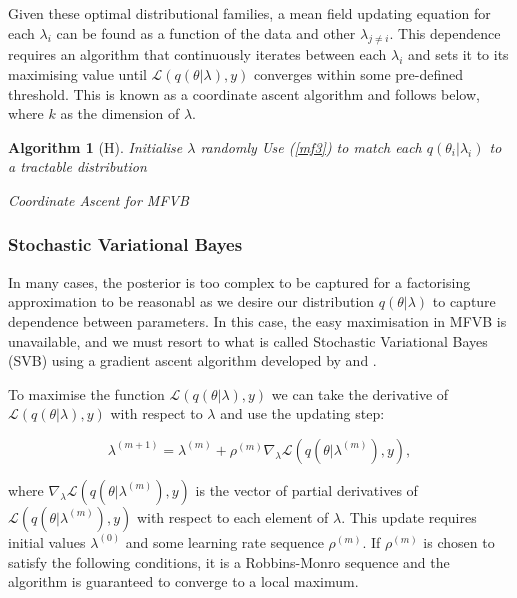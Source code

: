 \documentclass{article}\usepackage[]{graphicx}\usepackage[]{color}
\newtheorem{algorithm}[theorem]{Algorithm}
\begin{document}
Given these optimal distributional families, a mean field updating equation for each $\lambda_i$ can be found as a function of the data and other $\lambda_{j \neq i}$. This dependence requires an algorithm that continuously iterates between each $\lambda_i$ and sets it to its maximising value until $\mathcal{L}(q(\theta | \lambda), y)$ converges within some pre-defined threshold. This is known as a coordinate ascent algorithm and follows below, where $k$ as the dimension of $\lambda$.

\vspace{2mm}

\begin{algorithm}[H]
 Initialise $\lambda$ randomly\;
 Use (\ref{mf3}) to match each $q(\theta_i|\lambda_i)$ to a tractable distribution\;
 \caption{Coordinate Ascent for MFVB}
  \label{alg:algorithm1}
\end{algorithm}

\subsubsection{Stochastic Variational Bayes}

In many cases, the posterior is too complex to be captured for a factorising approximation to be reasonabl as we desire our distribution $q(\theta | \lambda)$ to capture dependence between parameters. In this case, the easy maximisation in MFVB is unavailable, and we must resort to what is called Stochastic Variational Bayes (SVB) using a gradient ascent algorithm developed by \citet{Paisley2012} and \citet{Ranganath2014}.

To maximise the function $\mathcal{L}(q(\theta | \lambda), y)$ we can take the derivative of $\mathcal{L}(q(\theta | \lambda), y)$ with respect to $\lambda$ and use the updating step:

\begin{equation}
\label{SGA1}
\lambda^{(m+1)} = \lambda^{(m)} + \rho^{(m)} \nabla_{\lambda} \mathcal{L}(q(\theta | \lambda^{(m)}), y),
\end{equation}

where $\nabla_{\lambda}\mathcal{L}(q(\theta | \lambda^{(m)}), y)$ is the vector of partial derivatives of $\mathcal{L}(q(\theta | \lambda^{(m)}), y)$ with respect to each element of $\lambda$. This update requires initial values $\lambda^{(0)}$ and some learning rate sequence $\rho^{(m)}$. If $\rho^{(m)}$ is chosen to satisfy the following conditions, it is a Robbins-Monro sequence and the algorithm is guaranteed to converge to a local maximum.
\end{document}
